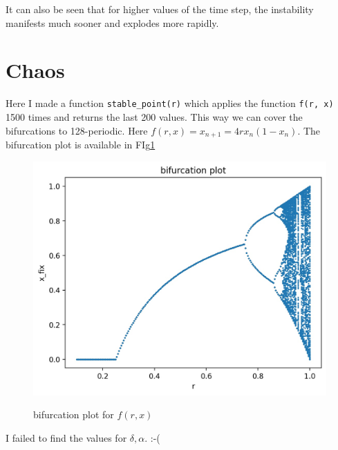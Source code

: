 \documentclass[12pt, a4paper]{article}
\begin{document}
	It can also be seen that for higher values of the time step, the instability manifests much sooner and explodes more rapidly.

	\section{Chaos}
	Here I made a function \texttt{stable\_point(r)} which applies the function \texttt{f(r, x)} 1500 times and returns the last 200 values.
	This way we can cover the bifurcations to 128-periodic. Here $f(r, x) = x_{n + 1} = 4rx_{n} (1 - x_{n})$.  The bifurcation plot is available in FIg\ref{fig:bifurcation}
	\begin{figure}[h!]
		\centering
		\includegraphics[width=0.9\linewidth]{../p4/bifurcation.jpg}
		\label{fig:bifurcation}
		\caption{bifurcation plot for $f(r, x)$}
	\end{figure}

	I failed to find the values for $\delta, \alpha$. :-(
\end{document}
